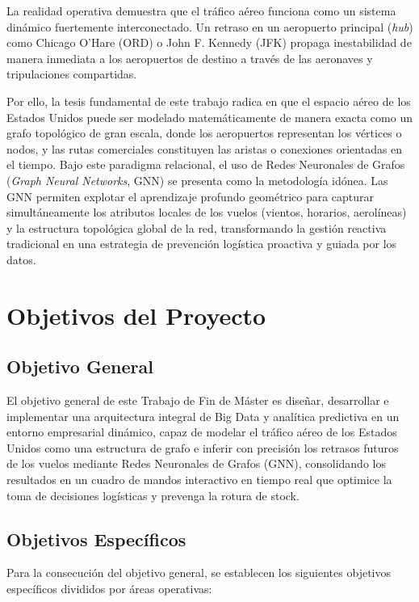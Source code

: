 \documentclass[12pt,oneside,a4paper]{report}
\renewcommand{\_}{\textunderscore\allowbreak}
\begin{document}
La realidad operativa demuestra que el tráfico aéreo funciona como un sistema dinámico fuertemente interconectado. Un retraso en un aeropuerto principal (\textit{hub}) como Chicago O'Hare (ORD) o John F. Kennedy (JFK) propaga inestabilidad de manera inmediata a los aeropuertos de destino a través de las aeronaves y tripulaciones compartidas.

Por ello, la tesis fundamental de este trabajo radica en que el espacio aéreo de los Estados Unidos puede ser modelado matemáticamente de manera exacta como un grafo topológico de gran escala, donde los aeropuertos representan los vértices o nodos, y las rutas comerciales constituyen las aristas o conexiones orientadas en el tiempo. Bajo este paradigma relacional, el uso de Redes Neuronales de Grafos (\textit{Graph Neural Networks}, GNN) se presenta como la metodología idónea. Las GNN permiten explotar el aprendizaje profundo geométrico para capturar simultáneamente los atributos locales de los vuelos (vientos, horarios, aerolíneas) y la estructura topológica global de la red, transformando la gestión reactiva tradicional en una estrategia de prevención logística proactiva y guiada por los datos.

\section{Objetivos del Proyecto}
\label{sec:objetivos}

\subsection{Objetivo General}
\label{sub:obj_general}

El objetivo general de este Trabajo de Fin de Máster es diseñar, desarrollar e implementar una arquitectura integral de Big Data y analítica predictiva en un entorno empresarial dinámico, capaz de modelar el tráfico aéreo de los Estados Unidos como una estructura de grafo e inferir con precisión los retrasos futuros de los vuelos mediante Redes Neuronales de Grafos (GNN), consolidando los resultados en un cuadro de mandos interactivo en tiempo real que optimice la toma de decisiones logísticas y prevenga la rotura de stock.

\subsection{Objetivos Específicos}
\label{sub:obj_especificos}

Para la consecución del objetivo general, se establecen los siguientes objetivos específicos divididos por áreas operativas:
\end{document}
